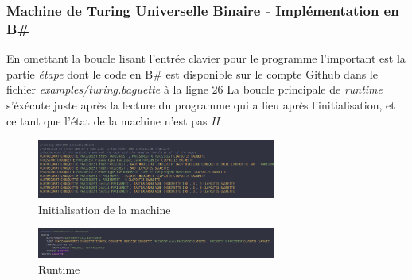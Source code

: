 \documentclass{beamer}
\newcommand{\bs}{B\# }
\begin{document}
    \begin{frame}[allowframebreaks]
        \frametitle{Machine de Turing Universelle Binaire - Implémentation en \bs }
        En omettant la boucle lisant l'entrée clavier pour le programme l'important est la partie \textit{étape} dont le code en \bs est 
        disponible sur le compte Github dans le fichier \textit{examples/turing.baguette} à la ligne $26$
        La boucle principale de \textit{runtime} s'éxécute juste après la lecture du programme qui a lieu après l'initialisation, et ce tant que l'état de la machine n'est pas $H$
        \begin{figure}[H]
            \center 
            \includegraphics[width=0.7\textwidth]{img/init.png}
            \caption{Initialisation de la machine}
        \end{figure}
        \begin{figure}[H]
            \center
            \includegraphics[width=0.7\textwidth]{img/runtime.png}
            \caption{Runtime}
        \end{figure}
    \end{frame}
\end{document}
